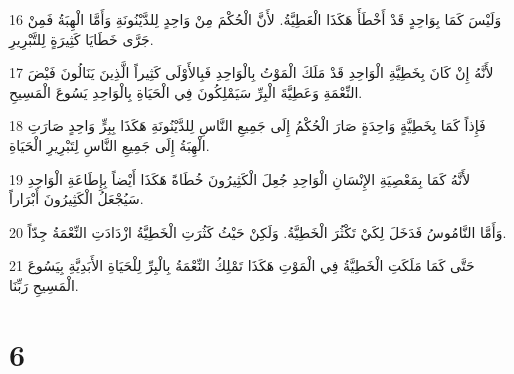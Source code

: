 \par 16 وَلَيْسَ كَمَا بِوَاحِدٍ قَدْ أَخْطَأَ هَكَذَا الْعَطِيَّةُ. لأَنَّ الْحُكْمَ مِنْ وَاحِدٍ لِلدَّيْنُونَةِ وَأَمَّا الْهِبَةُ فَمِنْ جَرَّى خَطَايَا كَثِيرَةٍ لِلتَّبْرِيرِ.
\par 17 لأَنَّهُ إِنْ كَانَ بِخَطِيَّةِ الْوَاحِدِ قَدْ مَلَكَ الْمَوْتُ بِالْوَاحِدِ فَبِالأَوْلَى كَثِيراً الَّذِينَ يَنَالُونَ فَيْضَ النِّعْمَةِ وَعَطِيَّةَ الْبِرِّ سَيَمْلِكُونَ فِي الْحَيَاةِ بِالْوَاحِدِ يَسُوعَ الْمَسِيحِ.
\par 18 فَإِذاً كَمَا بِخَطِيَّةٍ وَاحِدَةٍ صَارَ الْحُكْمُ إِلَى جَمِيعِ النَّاسِ لِلدَّيْنُونَةِ هَكَذَا بِبِرٍّ وَاحِدٍ صَارَتِ الْهِبَةُ إِلَى جَمِيعِ النَّاسِ لِتَبْرِيرِ الْحَيَاةِ.
\par 19 لأَنَّهُ كَمَا بِمَعْصِيَةِ الإِنْسَانِ الْوَاحِدِ جُعِلَ الْكَثِيرُونَ خُطَاةً هَكَذَا أَيْضاً بِإِطَاعَةِ الْوَاحِدِ سَيُجْعَلُ الْكَثِيرُونَ أَبْرَاراً.
\par 20 وَأَمَّا النَّامُوسُ فَدَخَلَ لِكَيْ تَكْثُرَ الْخَطِيَّةُ. وَلَكِنْ حَيْثُ كَثُرَتِ الْخَطِيَّةُ ازْدَادَتِ النِّعْمَةُ جِدّاً.
\par 21 حَتَّى كَمَا مَلَكَتِ الْخَطِيَّةُ فِي الْمَوْتِ هَكَذَا تَمْلِكُ النِّعْمَةُ بِالْبِرِّ لِلْحَيَاةِ الأَبَدِيَّةِ بِيَسُوعَ الْمَسِيحِ رَبِّنَا.

\chapter{6}

